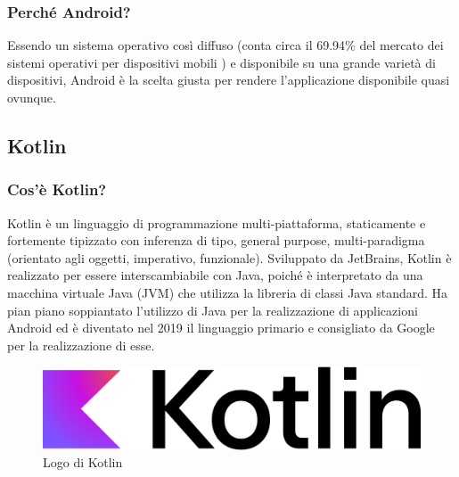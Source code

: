             \subsubsection{Perché Android?}
                Essendo un sistema operativo così diffuso (conta circa il 69.94\% del mercato dei sistemi operativi per dispositivi mobili \cite{Statcounter1}) e disponibile su una grande varietà di dispositivi, Android è la scelta giusta per rendere l'applicazione disponibile quasi ovunque.
                
        \subsection{Kotlin}
            \subsubsection{Cos'è Kotlin? \cite{Wikipedia2}}
                Kotlin è un linguaggio di programmazione multi-piattaforma, staticamente e fortemente tipizzato con inferenza di tipo, general purpose, multi-paradigma (orientato agli oggetti, imperativo, funzionale). Sviluppato da JetBrains, Kotlin è realizzato per essere interscambiabile con Java, poiché è interpretato da una macchina virtuale Java (JVM) che utilizza la libreria di classi Java standard. Ha pian piano soppiantato l'utilizzo di Java per la realizzazione di applicazioni Android ed è diventato nel 2019 il linguaggio primario e consigliato da Google per la realizzazione di esse.
            \begin{figure}[htbp!]
                \centering
                \includegraphics[width=0.5\linewidth]{Immagini/System Design/Kotlin.png}
                \caption{Logo di Kotlin}
            \end{figure}
